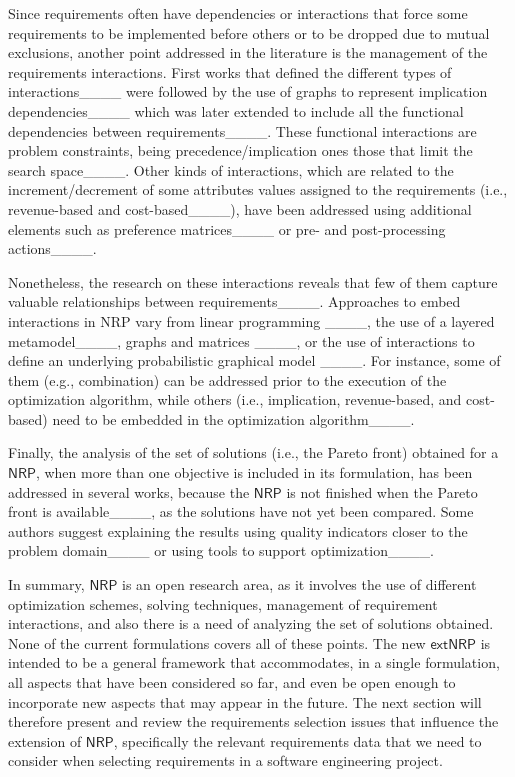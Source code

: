 Since requirements often have dependencies or interactions that force some requirements to be implemented before others or to be dropped due to mutual exclusions, another point addressed  in the literature is the management of the requirements interactions. First works that defined the different types of interactions____ were followed by the use of graphs to represent implication dependencies____ which was later extended to include all the functional dependencies between requirements____. 
These functional interactions are problem constraints, being precedence/implication ones those that limit the search space____. Other kinds of interactions, which are related to the increment/decrement of some attributes values assigned to the requirements (i.e., revenue-based and cost-based____), have been addressed  using additional elements such as preference matrices____ or pre- and post-processing actions____.

Nonetheless, the research on these interactions reveals that few of them capture valuable relationships between requirements____. Approaches to embed interactions in NRP vary from linear programming ____, the use of a layered metamodel____, graphs and matrices ____, or the use of interactions to define an underlying probabilistic graphical model ____. For instance, some of them (e.g., combination) can be addressed prior to the execution of the optimization algorithm, while others (i.e., implication, revenue-based, and cost-based) need to be embedded in the optimization algorithm____.

Finally, the analysis of the set of solutions (i.e., the Pareto front) obtained for a \ensuremath{\mathsf{NRP}}, when more than one objective is included in its formulation, has been addressed in several works,  because the \ensuremath{\mathsf{NRP}} is not finished when the Pareto front is available____, as the solutions have not yet been compared. Some authors suggest explaining the results using quality indicators closer to the problem domain____ or using tools to support optimization____.

In summary, \ensuremath{\mathsf{NRP}} is an open research area, as it involves the use of different optimization schemes, solving techniques, management of requirement interactions, and also there is a need of analyzing the set of solutions obtained. None of the current formulations covers all of these points. The new \ensuremath{\mathsf{extNRP}} is intended to be a general framework that accommodates, in a single formulation, all aspects that have been considered so far, and even be open enough to incorporate new aspects that may appear in the future.  The next section will therefore present and review the requirements selection issues that influence the extension of \ensuremath{\mathsf{NRP}}, specifically the relevant requirements data that we need to consider when selecting requirements in a software engineering project.